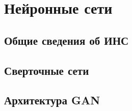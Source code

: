 \section{Нейронные сети}
\subsection{Общие сведения об ИНС}
\subsection{Сверточные сети}
\subsection{Архитектура GAN}